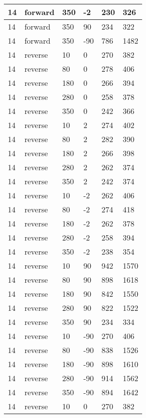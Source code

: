 \begin{table}
\begin{center}
\begin{tabular}{|l|l|l|l|l|l|}
			\hline
			14 & forward & 350 & -2 & 230 & 326 \\
			\hline
			14 & forward & 350 & 90 & 234 & 322 \\
			\hline
			14 & forward & 350 & -90 & 786 & 1482 \\
			\hline
			14 & reverse & 10 & 0 & 270 & 382 \\
			\hline
			14 & reverse & 80 & 0 & 278 & 406 \\
			\hline
			14 & reverse & 180 & 0 & 266 & 394 \\
			\hline
			14 & reverse & 280 & 0 & 258 & 378 \\
			\hline
			14 & reverse & 350 & 0 & 242 & 366 \\
			\hline
			14 & reverse & 10 & 2 & 274 & 402 \\
			\hline
			14 & reverse & 80 & 2 & 282 & 390 \\
			\hline
			14 & reverse & 180 & 2 & 266 & 398 \\
			\hline
			14 & reverse & 280 & 2 & 262 & 374 \\
			\hline
			14 & reverse & 350 & 2 & 242 & 374 \\
			\hline
			14 & reverse & 10 & -2 & 262 & 406 \\
			\hline
			14 & reverse & 80 & -2 & 274 & 418 \\
			\hline
			14 & reverse & 180 & -2 & 262 & 378 \\
			\hline
			14 & reverse & 280 & -2 & 258 & 394 \\
			\hline
			14 & reverse & 350 & -2 & 238 & 354 \\
			\hline
			14 & reverse & 10 & 90 & 942 & 1570 \\
			\hline
			14 & reverse & 80 & 90 & 898 & 1618 \\
			\hline
			14 & reverse & 180 & 90 & 842 & 1550 \\
			\hline
			14 & reverse & 280 & 90 & 822 & 1522 \\
			\hline
			14 & reverse & 350 & 90 & 234 & 334 \\
			\hline
			14 & reverse & 10 & -90 & 270 & 406 \\
			\hline
			14 & reverse & 80 & -90 & 838 & 1526 \\
			\hline
			14 & reverse & 180 & -90 & 898 & 1610 \\
			\hline
			14 & reverse & 280 & -90 & 914 & 1562 \\
			\hline
			14 & reverse & 350 & -90 & 894 & 1642 \\
			\hline
			14 & reverse & 10 & 0 & 270 & 382 \\

\end{tabular}
\end{center}
\end{table}
